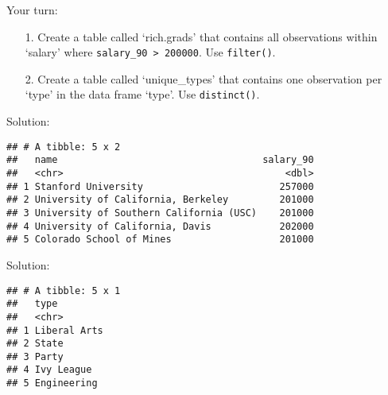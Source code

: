 \documentclass[ignorenonframetext,]{beamer}
\newenvironment{Shaded}{\begin{snugshade}}{\end{snugshade}}
\newcommand{\KeywordTok}[1]{\textcolor[rgb]{0.13,0.29,0.53}{\textbf{#1}}}
\newcommand{\DecValTok}[1]{\textcolor[rgb]{0.00,0.00,0.81}{#1}}
\newcommand{\StringTok}[1]{\textcolor[rgb]{0.31,0.60,0.02}{#1}}
\newcommand{\OperatorTok}[1]{\textcolor[rgb]{0.81,0.36,0.00}{\textbf{#1}}}
\newcommand{\NormalTok}[1]{#1}
\begin{document}
\begin{frame}[fragile]{Your turn:}

\begin{enumerate}
\def\labelenumi{\arabic{enumi}.}
\item[1.]
  Create a table called `rich.grads' that contains all observations
  within `salary' where \texttt{salary\_90\ \textgreater{}\ 200000}. Use
  \texttt{filter()}.
\item[2.]
  Create a table called `unique\_types' that contains one observation
  per `type' in the data frame `type'. Use \texttt{distinct()}.
\end{enumerate}

\end{frame}

\begin{frame}[fragile]{Solution:}

\begin{Shaded}
\end{Shaded}

\begin{verbatim}
## # A tibble: 5 x 2
##   name                                    salary_90
##   <chr>                                       <dbl>
## 1 Stanford University                        257000
## 2 University of California, Berkeley         201000
## 3 University of Southern California (USC)    201000
## 4 University of California, Davis            202000
## 5 Colorado School of Mines                   201000
\end{verbatim}

\end{frame}

\begin{frame}[fragile]{Solution:}

\begin{Shaded}
\end{Shaded}

\begin{verbatim}
## # A tibble: 5 x 1
##   type        
##   <chr>       
## 1 Liberal Arts
## 2 State       
## 3 Party       
## 4 Ivy League  
## 5 Engineering
\end{verbatim}

\end{frame}
\end{document}
